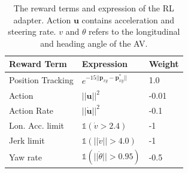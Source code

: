 \documentclass[letterpaper, 10 pt, conference]{ieeeconf}  %
\begin{document}
\begin{table}
\begin{center}
\setlength{\tabcolsep}{5pt}
\renewcommand{\arraystretch}{1.1}
\small
\begin{tabular}{y{70}x{70}x{60}}
\toprule
Reward Term       & Expression & Weight \\ \midrule
Position Tracking & $e^{-15||\mathbf{p}_{xy}-\mathbf{p}^*_{xy}||}$ &  1.0     \\
Action            & $||\mathbf{u}||^2$ & -0.01    \\
Action Rate       & $||\dot{\mathbf{u}}||^2$ & -0.1     \\
Lon. Acc. limit   & $\mathbb{1}({\dot{v}}>2.4)$ & -1    \\
Jerk limit        & $\mathbb{1}(||{\ddot{v}}||>4.0)$  & -1        \\
Yaw rate          & $\mathbb{1}(||{\dot{\theta}}||>0.95)$ & -0.5        \\ \bottomrule
\end{tabular}
\end{center}
\vspace{0.5em}
\caption{The reward terms and expression of the RL adapter. Action $\mathbf{u}$ contains acceleration and steering rate. $v$ and $\theta$ refers to the longitudinal and heading angle of the AV.}
\label{tab:rewards}
\vspace{-1em}
\end{table}
\end{document}
